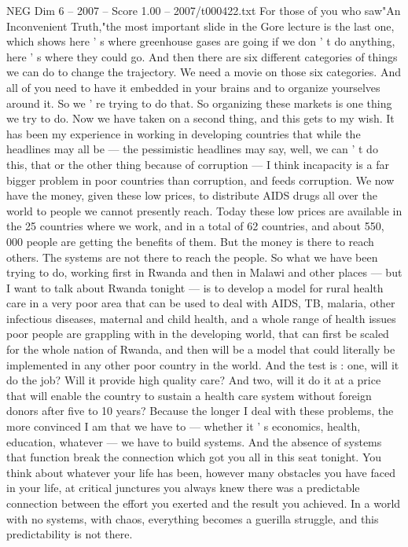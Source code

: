 \begin{textsample}{NEG Dim 6 – 2007 – Score 1.00 – 2007/t000422.txt}
For those of you who saw"An Inconvenient Truth,"the most important slide in the Gore lecture is the last one, which shows here ' s where greenhouse gases are going if we don ' t do anything, here ' s where they could go.
And then there are six different categories of things we can do to change the trajectory.
We need a movie on those six categories.
And all of you need to have it embedded in your brains and to organize yourselves around it.
So we ' re trying to do that.
So organizing these markets is one thing we try to do.
Now we have taken on a second thing, and this gets to my wish.
It has been my experience in working in developing countries that while the headlines may all be — the pessimistic headlines may say, well, we can ' t do this, that or the other thing because of corruption — I think incapacity is a far bigger problem in poor countries than corruption, and feeds corruption.
We now have the money, given these low prices, to distribute AIDS drugs all over the world to people we cannot presently reach.
Today these low prices are available in the 25 countries where we work, and in a total of 62 countries, and about 550, 000 people are getting the benefits of them.
But the money is there to reach others.
The systems are not there to reach the people.
So what we have been trying to do, working first in Rwanda and then in Malawi and other places — but I want to talk about Rwanda tonight — is to develop a model for rural health care in a very poor area that can be used to deal with AIDS, TB, malaria, other infectious diseases, maternal and child health, and a whole range of health issues poor people are grappling with in the developing world, that can first be scaled for the whole nation of Rwanda, and then will be a model that could literally be implemented in any other poor country in the world.
And the test is : one, will it do the job?
Will it provide high quality care?
And two, will it do it at a price that will enable the country to sustain a health care system without foreign donors after five to 10 years?
Because the longer I deal with these problems, the more convinced I am that we have to — whether it ' s economics, health, education, whatever — we have to build systems.
And the absence of systems that function break the connection which got you all in this seat tonight.
You think about whatever your life has been, however many obstacles you have faced in your life, at critical junctures you always knew there was a predictable connection between the effort you exerted and the result you achieved.
In a world with no systems, with chaos, everything becomes a guerilla struggle, and this predictability is not there.

\end{textsample}
